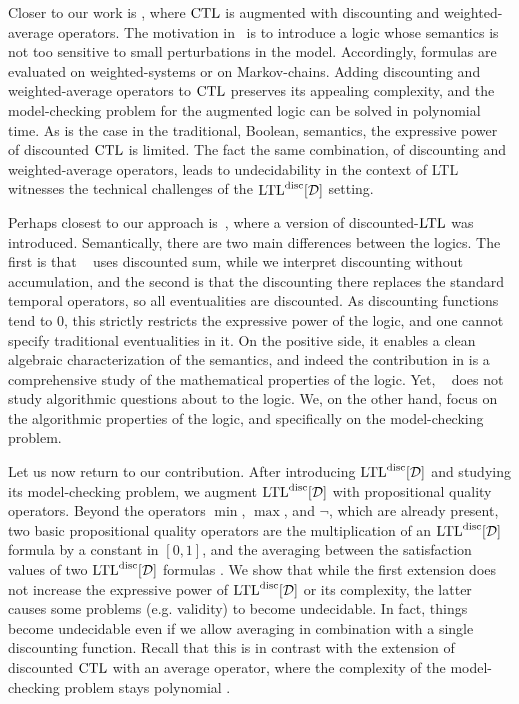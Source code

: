 \documentclass{llncs}
\newcommand{\LTL}{{\ensuremath{\rm LTL}}\xspace}
\newcommand{\CTL}{{\rm CTL}}
\newcommand{\D}{{\cal D}}
\newcommand{\DLTL}{\ensuremath{\LTL^{\text{disc}}[\D]}}
\begin{document}
Closer to our work is \cite{AFHMS05}, where $\CTL$ is augmented with discounting and weighted-average operators.  The motivation in~\cite{AFHMS05} is to introduce a logic whose semantics is not too sensitive to small perturbations in the model. Accordingly, formulas are evaluated on weighted-systems or on Markov-chains. Adding discounting and weighted-average operators to $\CTL$ preserves its appealing complexity, and the model-checking problem for the augmented logic can be solved in polynomial time. As is the case in the traditional, Boolean, semantics, the expressive power of discounted $\CTL$ is limited.
The fact the same combination, of discounting and weighted-average operators, leads to undecidability in the context of LTL witnesses the technical challenges of the $\DLTL$ setting.  

Perhaps closest to our approach is~\cite{Man12}, where a version of discounted-\LTL was introduced. Semantically, there are two main differences between the logics. The first is that ~\cite{Man12} uses discounted sum, while we interpret discounting without accumulation, and the second is that the discounting there replaces the standard temporal operators, so all  eventualities are discounted. As discounting functions tend to $0$, this strictly restricts the expressive power of the logic, and one cannot specify traditional eventualities in it. On the positive side, it enables a clean algebraic characterization of the semantics, and indeed the contribution in \cite{Man12} is a comprehensive study of the mathematical properties of the logic. Yet, ~\cite{Man12} does not study algorithmic questions
about to the logic. We, on the other hand, focus on the algorithmic properties of the logic, and specifically on the model-checking problem.

Let us now return to our contribution. After introducing $\DLTL$ and studying its model-checking problem, we augment $\DLTL$ with propositional quality operators. Beyond the operators $\min$, $\max$, and $\neg$, which are already present, two basic propositional quality operators are the multiplication of an $\DLTL$ formula by a constant in $[0,1]$, and the averaging between the satisfaction values of two $\DLTL$ formulas \cite{ABK13}. We show that while the first extension does not increase the expressive power of $\DLTL$ or its complexity, the latter causes 
some problems (e.g. validity) to become undecidable. In fact, things become undecidable even if we allow averaging in combination with a single discounting function. Recall that this is in contrast with the extension of discounted $\CTL$ with an average operator, where the complexity of the model-checking problem stays polynomial \cite{AFHMS05}.
\end{document}

